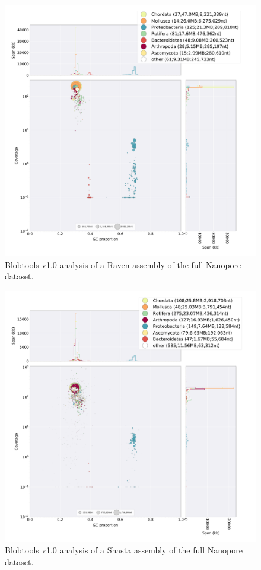 \begin{suppsection}
  \begin{figure}[ht]
    \centering
     \includegraphics[width=15cm]{fig/benchmark/ONT_RAVEN.png}
   \caption{Blobtools v1.0 analysis of a Raven assembly of the full Nanopore dataset.}
   \label{fig:blobtools_raven_ont}
 \end{figure}

  \begin{figure}[ht]
    \centering
     \includegraphics[width=15cm]{fig/benchmark/ONT_SHASTA.png}
   \caption{Blobtools v1.0 analysis of a Shasta assembly of the full Nanopore dataset.}
   \label{fig:blobtools_shasta_ont}
 \end{figure}


\end{suppsection}
